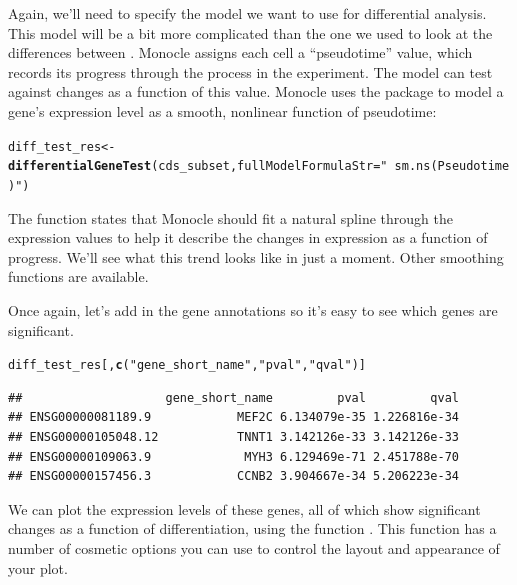 \documentclass[10pt,oneside]{article}\usepackage[]{graphicx}\usepackage[]{color}
\makeatletter
\newcommand{\hlstr}[1]{\textcolor[rgb]{0.192,0.494,0.8}{#1}}%
\newcommand{\hlstd}[1]{\textcolor[rgb]{0.345,0.345,0.345}{#1}}%
\newcommand{\hlkwb}[1]{\textcolor[rgb]{0.69,0.353,0.396}{#1}}%
\newcommand{\hlkwc}[1]{\textcolor[rgb]{0.333,0.667,0.333}{#1}}%
\newcommand{\hlkwd}[1]{\textcolor[rgb]{0.737,0.353,0.396}{\textbf{#1}}}%
\newenvironment{kframe}{%
 \def\at@end@of@kframe{}%
 \ifinner\ifhmode%
  \def\at@end@of@kframe{\end{minipage}}%
  \begin{minipage}{\columnwidth}%
 \fi\fi%
 \def\FrameCommand##1{\hskip\@totalleftmargin \hskip-\fboxsep
 \colorbox{shadecolor}{##1}\hskip-\fboxsep
     \hskip-\linewidth \hskip-\@totalleftmargin \hskip\columnwidth}%
 \MakeFramed {\advance\hsize-\width
   \@totalleftmargin\z@ \linewidth\hsize
   \@setminipage}}%
 {\par\unskip\endMakeFramed%
 \at@end@of@kframe}
\newenvironment{knitrout}{}{} %
\makeatother
\begin{document}
Again, we'll need to specify the model we want to use for differential analysis.  This model will be a bit more complicated than the one we used to look at the differences between .  Monocle assigns each cell a ``pseudotime'' value, which records its progress through the process in the experiment.  The model can test against changes as a function of this value. Monocle uses the  package to model a gene's expression level as a smooth, nonlinear function of pseudotime:
\begin{knitrout}
\color{fgcolor}\begin{kframe}
\begin{alltt}
\hlstd{diff_test_res} \hlkwb{<-} \hlkwd{differentialGeneTest}\hlstd{(cds_subset,}  \hlkwc{fullModelFormulaStr}\hlstd{=}\hlstr{"~sm.ns(Pseudotime)"}\hlstd{)}
\end{alltt}
\end{kframe}
\end{knitrout}

The  function states that Monocle should fit a natural spline through the expression values to help it describe the changes in expression as a function of progress. We'll see what this trend looks like in just a moment. Other smoothing functions are available.

Once again, let's add in the gene annotations so it's easy to see which genes are significant.
\begin{knitrout}
\color{fgcolor}\begin{kframe}
\begin{alltt}
\hlstd{diff_test_res[,}\hlkwd{c}\hlstd{(}\hlstr{"gene_short_name"}\hlstd{,} \hlstr{"pval"}\hlstd{,} \hlstr{"qval"}\hlstd{)]}
\end{alltt}
\begin{verbatim}
##                    gene_short_name         pval         qval
## ENSG00000081189.9            MEF2C 6.134079e-35 1.226816e-34
## ENSG00000105048.12           TNNT1 3.142126e-33 3.142126e-33
## ENSG00000109063.9             MYH3 6.129469e-71 2.451788e-70
## ENSG00000157456.3            CCNB2 3.904667e-34 5.206223e-34
\end{verbatim}
\end{kframe}
\end{knitrout}

We can plot the expression levels of these genes, all of which show significant changes as a function of differentiation, using the function . This function has a number of cosmetic options you can use to control the layout and appearance of your plot.
\end{document}
